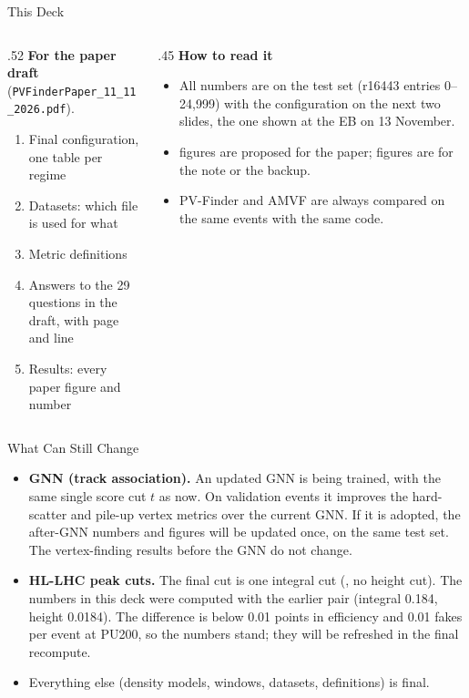 \begin{frame}{This Deck}
\small
\begin{columns}[T]
\begin{column}{.52\linewidth}
\textbf{For the paper draft} (\texttt{PVFinderPaper\_11\_11\_2026.pdf}).
\begin{enumerate}\setlength\itemsep{.3em}
\item Final configuration, one table per regime
\item Datasets: which file is used for what
\item Metric definitions
\item Answers to the 29 questions in the draft, with page and line
\item Results: every paper figure and number
\end{enumerate}
\end{column}
\begin{column}{.45\linewidth}
\textbf{How to read it}
\begin{itemize}\setlength\itemsep{.3em}
\item All numbers are on the test set (r16443 entries 0--24,999) with the configuration on the next two slides, the one shown at the EB on 13 November.
\item \mainbadge{} figures are proposed for the paper; \backupbadge{} figures are for the note or the backup.
\item PV-Finder and AMVF are always compared on the same events with the same code.
\end{itemize}
\end{column}
\end{columns}
\end{frame}

\begin{frame}{What Can Still Change}
\small
\begin{itemize}\setlength\itemsep{.6em}
\item \textbf{GNN (track association).} An updated GNN is being trained, with the same single score cut $t$ as now. On validation events it improves the hard-scatter and pile-up vertex metrics over the current GNN. If it is adopted, the after-GNN numbers and figures will be updated once, on the same test set. The vertex-finding results before the GNN do not change.
\item \textbf{HL-LHC peak cuts.} The final cut is one integral cut (\hlIntegral, no height cut). The numbers in this deck were computed with the earlier pair (integral 0.184, height 0.0184). The difference is below 0.01 points in efficiency and 0.01 fakes per event at PU200, so the numbers stand; they will be refreshed in the final recompute.
\item Everything else (density models, windows, datasets, definitions) is final.
\end{itemize}
\end{frame}

